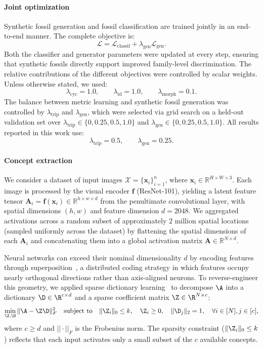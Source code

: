 \documentclass[pdflatex,lineno,sn-nature]{sn-jnl}%
\theoremstyle{plain}%
\theoremstyle{definition}%
\theoremstyle{remark}%
\begin{document}
\paragraph{Joint optimization}
Synthetic fossil generation and fossil classification are trained jointly in an end-to-end manner. The complete objective is:
\[
\mathcal{L}=\mathcal{L}_{\text{classif}}+\lambda_{\text{gen}}\mathcal{L}_{\text{gen}}.
\]
Both the classifier and generator parameters were updated at every step, ensuring that synthetic fossils directly support improved family-level discrimination. The relative contributions of the different objectives were controlled by scalar weights. 
Unless otherwise stated, we used:
\[
\lambda_{\text{cyc}} = 1.0,
\qquad
\lambda_{\text{id}} = 1.0,
\qquad
\lambda_{\text{morph}} = 0.1.
\]
The balance between metric learning and synthetic fossil generation was controlled by
$\lambda_{\text{trip}}$ and $\lambda_{\text{gen}}$, which were selected via grid search on a held-out
validation set over $\lambda_{\text{trip}} \in \{0, 0.25, 0.5, 1.0\}$ and $\lambda_{\text{gen}} \in \{0, 0.25, 0.5, 1.0\}$. All results reported in this work use:
\[
\lambda_{\text{trip}} = 0.5,
\qquad
\lambda_{\text{gen}} = 0.25.
\]




\paragraph{Concept extraction} 
We consider a dataset of input images $\mathcal{X} = \{ \mathbf{x}_i \}_{i=1}^n$, where $\mathbf{x}_i \in \mathbb{R}^{H \times W \times 3}$. Each image is processed by the visual encoder $\mathbf{f}$ (ResNet-101), yielding a latent feature tensor 
$\mathbf{A}_i = \mathbf{f}(\mathbf{x}_i) \in \mathbb{R}^{h \times w \times d}$ from the penultimate convolutional layer, with spatial dimensions $(h, w)$ and feature dimension $d = 2048$. We aggregated activations across a random subset of approximately 2 million spatial locations (sampled uniformly across the dataset) by flattening the spatial dimensions of each $\mathbf{A}_i$ and concatenating them into a global activation matrix 
$\mathbf{A} \in \mathbb{R}^{N \times d}$.


Neural networks can exceed their nominal dimensionality $d$ by encoding features through superposition~\citep{elhage2022toymodelssuperposition}, a distributed coding strategy in which features occupy nearly orthogonal directions rather than axis-aligned neurons. To reverse-engineer this geometry, we applied sparse dictionary learning~\citep{holistic} to decompose $\A$ into a dictionary $\D \in \R^{c \times d}$ and a sparse coefficient matrix $\Z \in \R^{N \times c}$:
\[
\min_{\Z, \D} \|\A - \Z\D\|_F^2 \quad \text{subject to} \quad \|\Z_i\|_0 \leq k, \quad \Z_i \geq 0, \quad \|\D_j\|_2 = 1, \quad \forall i \in [N], j \in [c],
\]
where $c \geq d$ and $||\cdot||_F$ is the Frobenius norm. The sparsity constraint ($\|\Z_i\|_0 \leq k$) reflects that each input activates only a small subset of the $c$ available concepts.
\end{document}
